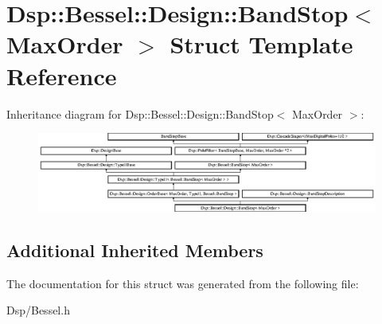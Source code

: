 \hypertarget{structDsp_1_1Bessel_1_1Design_1_1BandStop}{\section{Dsp\-:\-:Bessel\-:\-:Design\-:\-:Band\-Stop$<$ Max\-Order $>$ Struct Template Reference}
\label{structDsp_1_1Bessel_1_1Design_1_1BandStop}
}
Inheritance diagram for Dsp\-:\-:Bessel\-:\-:Design\-:\-:Band\-Stop$<$ Max\-Order $>$\-:\begin{figure}[H]
\begin{center}
\leavevmode
\includegraphics[height=2.610723cm]{structDsp_1_1Bessel_1_1Design_1_1BandStop}
\end{center}
\end{figure}
\subsection*{Additional Inherited Members}


The documentation for this struct was generated from the following file\-:\begin{DoxyCompactItemize}
\item 
Dsp/Bessel.\-h\end{DoxyCompactItemize}
